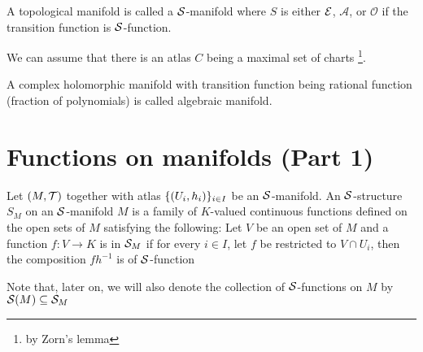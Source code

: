 \begin{definition}
	A topological manifold is called a $\mathcal{S}$-manifold where $S$ is either $\mathcal{E}$, $\mathcal{A}$, or $\mathcal{O}$ if the transition function is $\mathcal{S}$-function.
\end{definition}

\begin{remark}
	We can assume that there is an atlas $C$ being a maximal set of charts \footnote{by Zorn's lemma}.
\end{remark}

\begin{definition}
	A complex holomorphic manifold with transition function being rational function (fraction of polynomials) is called algebraic manifold.
\end{definition}

\section{Functions on manifolds (Part 1)}

\begin{definition}
	Let $(M, \mathcal{T})$ together with atlas $\{(U_i, h_i)\}_{i \in I}$ be an $\mathcal{S}$-manifold. An $\mathcal{S}$-structure $S_M$ on an $\mathcal{S}$-manifold $M$ is a family of $K$-valued continuous functions defined on the open sets of $M$ satisfying the following: Let $V$ be an open set of $M$ and a function $f: V \to K$ is in $\mathcal{S}_M$ if for every $i \in I$, let $f$ be restricted to $V \cap U_i$, then the composition $f h^{-1}$ is of $\mathcal{S}$-function
	
	\begin{center}
	\end{center}
	
	Note that, later on, we will also denote the collection of $\mathcal{S}$-functions on $M$ by $\mathcal{S}(M) \subseteq \mathcal{S}_M$
\end{definition}


